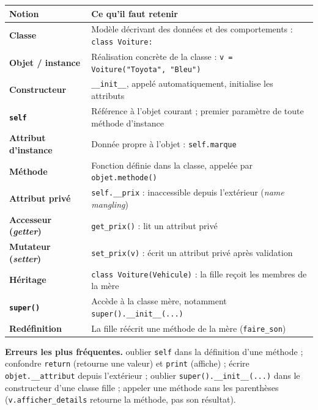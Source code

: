 \documentclass[11pt,a4paper]{article}
\newcommand{\py}[1]{\texttt{#1}}
\begin{document}
\begin{center}
\begin{tabularx}{\textwidth}{@{}>{\bfseries}p{4.3cm} X@{}}
\toprule
Notion & Ce qu'il faut retenir \\
\midrule
Classe & Modèle décrivant des données et des comportements : \py{class Voiture:} \\
Objet / instance & Réalisation concrète de la classe : \py{v = Voiture("Toyota", "Bleu")} \\
Constructeur & \py{__init__}, appelé automatiquement, initialise les attributs \\
\py{self} & Référence à l'objet courant ; premier paramètre de toute méthode d'instance \\
Attribut d'instance & Donnée propre à l'objet : \py{self.marque} \\
Méthode & Fonction définie dans la classe, appelée par \py{objet.methode()} \\
Attribut privé & \py{self.__prix} : inaccessible depuis l'extérieur (\emph{name mangling}) \\
Accesseur (\emph{getter}) & \py{get_prix()} : lit un attribut privé \\
Mutateur (\emph{setter}) & \py{set_prix(v)} : écrit un attribut privé après validation \\
Héritage & \py{class Voiture(Vehicule)} : la fille reçoit les membres de la mère \\
\py{super()} & Accède à la classe mère, notamment \py{super().__init__(...)} \\
Redéfinition & La fille réécrit une méthode de la mère (\py{faire_son}) \\
\bottomrule
\end{tabularx}
\end{center}

\begin{piege}
\textbf{Erreurs les plus fréquentes.}
oublier \py{self} dans la définition d'une méthode ;
confondre \py{return} (retourne une valeur) et \py{print} (affiche) ;
écrire \py{objet.__attribut} depuis l'extérieur ;
oublier \py{super().__init__(...)} dans le constructeur d'une classe fille ;
appeler une méthode sans les parenthèses (\py{v.afficher_details} retourne la méthode,
pas son résultat).
\end{piege}
\end{document}

